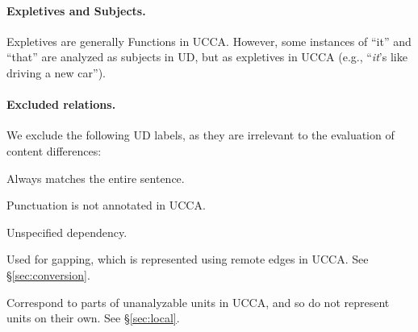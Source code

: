 \documentclass[11pt,a4paper]{article}
\begin{document}
\paragraph{Expletives and Subjects.}
    Expletives are generally Functions in UCCA.
    However, some instances of ``it'' and ``that'' are analyzed as subjects in UD,
    but as expletives in UCCA (e.g., ``\textit{it}'s like driving a new car'').    

\paragraph{Excluded relations.}
We exclude the following UD labels,
as they are irrelevant to the evaluation of content differences:

\begin{description}
\setlength{\itemsep}{0pt}
  \item[\texttt{root}.] Always matches the entire sentence.
  \item[\texttt{punct}.] Punctuation is not annotated in UCCA.
  \item[\texttt{dep}.] Unspecified dependency.
  \item[\texttt{orphan}.] Used for gapping, which is represented using remote edges in UCCA. See \S\ref{sec:conversion}.
  \item[\texttt{fixed}, \texttt{flat} and \texttt{goeswith}.] Correspond to parts of unanalyzable units in UCCA,
    and so do not represent units on their own. See \S\ref{sec:local}.
\end{description}




\end{document}
